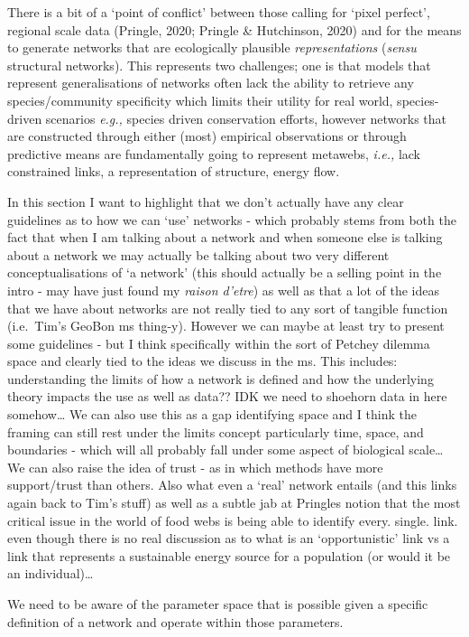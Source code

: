 \documentclass[
]{article}
\begin{document}
There is a bit of a `point of conflict' between those calling for `pixel
perfect', regional scale data (Pringle, 2020; Pringle \& Hutchinson,
2020) and for the means to generate networks that are ecologically
plausible \emph{representations} (\emph{sensu} structural networks).
This represents two challenges; one is that models that represent
generalisations of networks often lack the ability to retrieve any
species/community specificity which limits their utility for real world,
species-driven scenarios \emph{e.g.,} species driven conservation
efforts, however networks that are constructed through either (most)
empirical observations or through predictive means are fundamentally
going to represent metawebs, \emph{i.e.,} lack constrained links, a
representation of structure, energy flow.

In this section I want to highlight that we don't actually have any
clear guidelines as to how we can `use' networks - which probably stems
from both the fact that when I am talking about a network and when
someone else is talking about a network we may actually be talking about
two very different conceptualisations of `a network' (this should
actually be a selling point in the intro - may have just found my
\emph{raison d'etre}) as well as that a lot of the ideas that we have
about networks are not really tied to any sort of tangible function
(i.e.~Tim's GeoBon ms thing-y). However we can maybe at least try to
present some guidelines - but I think specifically within the sort of
Petchey dilemma space and clearly tied to the ideas we discuss in the
ms. This includes: understanding the limits of how a network is defined
and how the underlying theory impacts the use as well as data?? IDK we
need to shoehorn data in here somehow\ldots{} We can also use this as a
gap identifying space and I think the framing can still rest under the
limits concept particularly time, space, and boundaries - which will all
probably fall under some aspect of biological scale\ldots{} We can also
raise the idea of trust - as in which methods have more support/trust
than others. Also what even a `real' network entails (and this links
again back to Tim's stuff) as well as a subtle jab at Pringles notion
that the most critical issue in the world of food webs is being able to
identify every. single. link. even though there is no real discussion as
to what is an `opportunistic' link vs a link that represents a
sustainable energy source for a population (or would it be an
individual)\ldots{}

We need to be aware of the parameter space that is possible given a
specific definition of a network and operate within those parameters.
\end{document}
